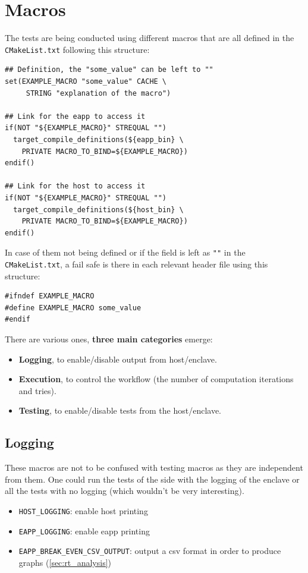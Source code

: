 \documentclass[11pt,a4paper]{report}
\begin{document}
\section{Macros}
The tests are being conducted using different macros that are all defined in the \verb|CMakeList.txt| following this structure:
\begin{verbatim}
## Definition, the "some_value" can be left to ""
set(EXAMPLE_MACRO "some_value" CACHE \
     STRING "explanation of the macro")

## Link for the eapp to access it
if(NOT "${EXAMPLE_MACRO}" STREQUAL "")
  target_compile_definitions(${eapp_bin} \
    PRIVATE MACRO_TO_BIND=${EXAMPLE_MACRO})
endif()

## Link for the host to access it
if(NOT "${EXAMPLE_MACRO}" STREQUAL "")
  target_compile_definitions(${host_bin} \
    PRIVATE MACRO_TO_BIND=${EXAMPLE_MACRO})
endif()
\end{verbatim}
In case of them not being defined or if the field is left as \verb|""| in the \verb|CMakeList.txt|, a fail safe is there in each relevant header file using this structure:
\begin{verbatim}
#ifndef EXAMPLE_MACRO
#define EXAMPLE_MACRO some_value
#endif
\end{verbatim}
There are various ones, \textbf{three main categories} emerge:
\begin{itemize}
    \item \textbf{Logging}, to enable/disable output from host/enclave.
    \item \textbf{Execution}, to control the workflow (the number of computation iterations and tries). 
    \item \textbf{Testing}, to enable/disable tests from the host/enclave. 
\end{itemize}

\subsection{Logging}
These macros are not to be confused with testing macros as they are independent from them.
One could run the tests of the side with the logging of the enclave or all the tests with no logging (which wouldn't be very interesting). 
\begin{itemize}
    \item \verb|HOST_LOGGING|: enable host printing
    \item \verb|EAPP_LOGGING|: enable eapp printing
    \item \verb|EAPP_BREAK_EVEN_CSV_OUTPUT|: output a csv format in order to produce graphs (\ref{sec:rt_analysis})
\end{itemize}
\end{document}

